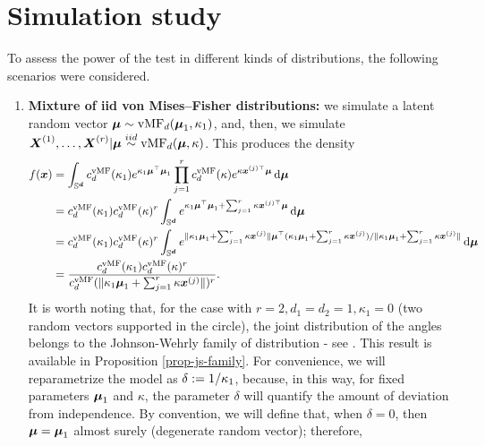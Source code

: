 \documentclass{article}
\begin{document}
\section{Simulation study}
\label{sec:simulation}


To assess the power of the test in different kinds of distributions, the following scenarios were considered.

\begin{enumerate}
    \item \textbf{Mixture of iid von Mises--Fisher distributions:} we simulate a latent random vector $\boldsymbol\mu \sim \mathrm{vMF}_d (\boldsymbol\mu_1, \kappa_1)$, and, then, we simulate $\boldsymbol{X}^{(1)}, \dots, \boldsymbol{X}^{(r)} | \boldsymbol\mu \stackrel {iid}\sim  \mathrm{vMF}_d (\boldsymbol\mu, \kappa)$. This produces the density
    \begin{align*}
        f(\boldsymbol{x}) &= \int_{\mathbb{S}^{\boldsymbol{d}}} c^\mathrm{vMF}_{d}(\kappa_1) e^{\kappa_1\boldsymbol\mu^{\top}\boldsymbol\mu_1} \prod_{j=1}^{r} c^\mathrm{vMF}_{d}(\kappa) e^{\kappa\boldsymbol{x}^{(j) \top}\boldsymbol\mu} \,\mathrm{d} \boldsymbol\mu \\
        &= c^\mathrm{vMF}_{d}(\kappa_1) c^\mathrm{vMF}_{d}(\kappa)^r \int_{\mathbb{S}^{\boldsymbol{d}}} e^{\kappa_1\boldsymbol\mu^{\top}\boldsymbol\mu_1 + \sum_{j=1}^{r} \kappa\boldsymbol{x}^{(j) \top}\boldsymbol\mu} \,\mathrm{d} \boldsymbol\mu\\
        &= c^\mathrm{vMF}_{d}(\kappa_1) c^\mathrm{vMF}_{d}(\kappa)^r \int_{\mathbb{S}^{\boldsymbol{d}}} e^{\|\kappa_1\boldsymbol\mu_1 + \sum_{j=1}^{r} \kappa\boldsymbol{x}^{(j)}\|\boldsymbol\mu^{\top}(\kappa_1\boldsymbol\mu_1 + \sum_{j=1}^{r} \kappa\boldsymbol{x}^{(j)})/\|\kappa_1\boldsymbol\mu_1 + \sum_{j=1}^{r} \kappa\boldsymbol{x}^{(j)}\|} \,\mathrm{d} \boldsymbol\mu\\
        &= \frac{c^\mathrm{vMF}_{d}(\kappa_1) c^\mathrm{vMF}_{d}(\kappa)^r}{ c^\mathrm{vMF}_{d}(\|\kappa_1\boldsymbol\mu_1 + \sum_{j=1}^{r} \kappa\boldsymbol{x}^{(j)}\|)^r}.
\end{align*}
It is worth noting that, for the case with $r=2, d_1 = d_2 = 1, \kappa_1 = 0$ (two random vectors supported in the circle), the joint distribution of the angles belongs to the  Johnson-Wehrly family of distribution - see \cite{Johnson1978,Wehrly1980}. This result is available in Proposition \ref{prop-js-family}.
    For convenience, we will reparametrize the model as $\delta := 1/\kappa_1$, because, in this way, for fixed parameters $\boldsymbol\mu_1$ and $\kappa$, the parameter $\delta$ will quantify the amount of deviation from independence. By convention, we will define that, when $\delta = 0$, then $\boldsymbol\mu = \boldsymbol\mu_1$ almost surely (degenerate random vector); therefore,

\end{enumerate}
\end{document}

